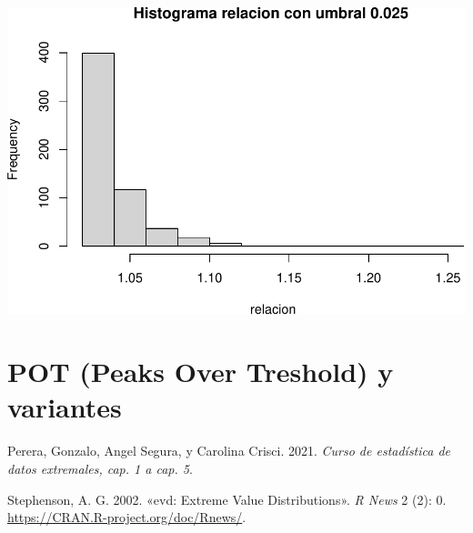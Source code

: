 \documentclass[
  oneside]{article}
\newenvironment{Shaded}{\begin{snugshade}}{\end{snugshade}}
\newcommand{\AttributeTok}[1]{\textcolor[rgb]{0.13,0.29,0.53}{#1}}
\newcommand{\FunctionTok}[1]{\textcolor[rgb]{0.13,0.29,0.53}{\textbf{#1}}}
\newcommand{\NormalTok}[1]{#1}
\newcommand{\SpecialCharTok}[1]{\textcolor[rgb]{0.81,0.36,0.00}{\textbf{#1}}}
\newcommand{\StringTok}[1]{\textcolor[rgb]{0.31,0.60,0.02}{#1}}
\newlength{\cslhangindent}
\newlength{\cslentryspacingunit} %
\newenvironment{CSLReferences}[2] %
 {%
  \setlength{\parindent}{0pt}
  \ifodd #1
  \let\oldpar\par
  \def\par{\hangindent=\cslhangindent\oldpar}
  \fi
  \setlength{\parskip}{#2\cslentryspacingunit}
 }%
 {}
\begin{document}
\begin{Shaded}
\end{Shaded}

\includegraphics{Entrega_Laura_Montaldo_files/figure-latex/unnamed-chunk-22-1.pdf}

\newpage

\section{POT (Peaks Over Treshold) y variantes}

\hypertarget{refs}{}
\begin{CSLReferences}{1}{0}
\leavevmode{}%
Perera, Gonzalo, Angel Segura, y Carolina Crisci. 2021. \emph{Curso de
estadística de datos extremales, cap. 1 a cap. 5}.

\leavevmode{}%
Stephenson, A. G. 2002. {«evd: Extreme Value Distributions»}. \emph{R
News} 2 (2): 0. \url{https://CRAN.R-project.org/doc/Rnews/}.

\end{CSLReferences}
\end{document}
